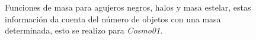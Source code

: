 %
\begin{figure}
 \centering
 \caption{Funciones de masa para agujeros negros, halos y masa estelar, estas información da cuenta del número de objetos con una masa determinada, esto se realizo para {\it{Cosmo01}}. }
 \label{fig: Funciones de masa cosmo01}
\end{figure}
